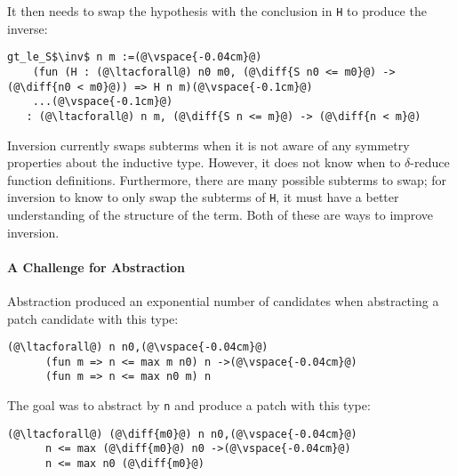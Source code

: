 It then needs to swap the hypothesis with the conclusion in \lstinline{H} to produce the inverse:

\begin{lstlisting}[language=coq]
  gt_le_S$\inv$ n m :=(@\vspace{-0.04cm}@)
    (fun (H : (@\ltacforall@) n0 m0, (@\diff{S n0 <= m0}@) -> (@\diff{n0 < m0}@)) => H n m)(@\vspace{-0.1cm}@)
    ...(@\vspace{-0.1cm}@)
   : (@\ltacforall@) n m, (@\diff{S n <= m}@) -> (@\diff{n < m}@)
\end{lstlisting}

Inversion currently swaps subterms when it is not
aware of any symmetry properties about the inductive type. However,
it does not know when to $\delta$-reduce function definitions. Furthermore, 
there are many possible subterms to swap;
for inversion to know to only swap the subterms of \lstinline{H}, it must have a better
understanding of the structure of the term. Both of these are ways to improve inversion.

\paragraph{A Challenge for Abstraction} Abstraction produced an exponential number of candidates when abstracting a patch candidate with this type:

\begin{lstlisting}[language=coq]
    (@\ltacforall@) n n0,(@\vspace{-0.04cm}@)
      (fun m => n <= max m n0) n ->(@\vspace{-0.04cm}@)
      (fun m => n <= max n0 m) n
\end{lstlisting}

The goal was to abstract by \lstinline{n} and produce a patch with this type:

\begin{lstlisting}[language=coq]
    (@\ltacforall@) (@\diff{m0}@) n n0,(@\vspace{-0.04cm}@)
      n <= max (@\diff{m0}@) n0 ->(@\vspace{-0.04cm}@)
      n <= max n0 (@\diff{m0}@)
\end{lstlisting}



